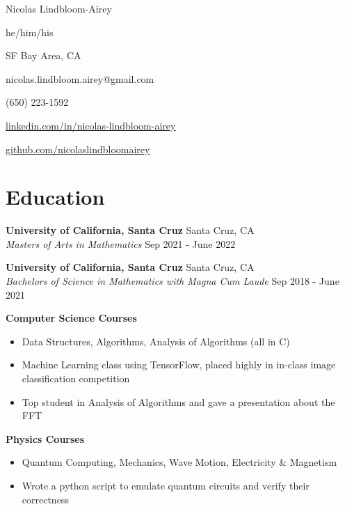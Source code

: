\documentclass[10pt,letterpaper]{article}
\begin{document}
\begin{minipage}[t]{0.6\textwidth}
{\Huge Nicolas Lindbloom-Airey}

he/him/his
\end{minipage}
\begin{minipage}[t]{0.4\textwidth}
SF Bay Area, CA 

 nicolas.lindbloom.airey@gmail.com

 (650) 223-1592 

 \href{https://www.linkedin.com/in/nicolas-lindbloom-airey/}{linkedin.com/in/nicolas-lindbloom-airey} 

 \href{https://github.com/nicolaslindbloomairey}{github.com/nicolaslindbloomairey} 

\end{minipage}


\section*{Education} \hrulefill 

\textbf{University of California, Santa Cruz} \hfill  Santa Cruz, CA\\
\textit{Masters of Arts in Mathematics} \hfill  Sep 2021 - June 2022

\textbf{University of California, Santa Cruz} \hfill  Santa Cruz, CA\\
\textit{Bachelors of Science in Mathematics with Magna Cum Laude} \hfill  Sep 2018 - June 2021

\textbf{Computer Science Courses}
\begin{itemize}
    \item Data Structures, Algorithms, Analysis of Algorithms (all in C)
    \item Machine Learning class using TensorFlow, placed highly in in-class image classification competition
    \item Top student in Analysis of Algorithms and gave a presentation about the FFT
\end{itemize}

\textbf{Physics Courses}
\begin{itemize}
    \item Quantum Computing, Mechanics, Wave Motion, Electricity \& Magnetism
    \item Wrote a python script to emulate quantum circuits and verify their correctness
\end{itemize}
\end{document}
